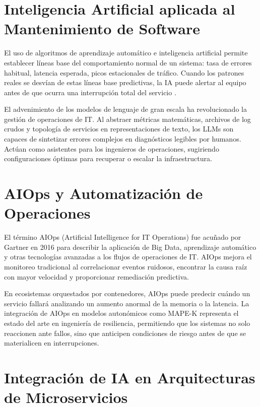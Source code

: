 \section{Inteligencia Artificial aplicada al Mantenimiento de Software}

El uso de algoritmos de aprendizaje autom\'{a}tico e inteligencia artificial permite establecer l\'{i}neas base del comportamiento normal de un sistema: tasa de errores habitual, latencia esperada, picos estacionales de tr\'{a}fico. Cuando los patrones reales se desv\'{i}an de estas l\'{i}neas base predictivas, la IA puede alertar al equipo antes de que ocurra una interrupci\'{o}n total del servicio \cite{notaro2021aiops}.

El advenimiento de los modelos de lenguaje de gran escala ha revolucionado la gesti\'{o}n de operaciones de IT. Al abstraer m\'{e}tricas matem\'{a}ticas, archivos de log crudos y topolog\'{i}a de servicios en representaciones de texto, los LLMs son capaces de sintetizar errores complejos en diagn\'{o}sticos legibles por humanos. Act\'{u}an como asistentes para los ingenieros de operaciones, sugiriendo configuraciones \'{o}ptimas para recuperar o escalar la infraestructura.

\section{AIOps y Automatizaci\'{o}n de Operaciones}

El t\'{e}rmino AIOps (Artificial Intelligence for IT Operations) fue acu\~{n}ado por Gartner en 2016 \cite{gartner2016aiops} para describir la aplicaci\'{o}n de Big Data, aprendizaje autom\'{a}tico y otras tecnolog\'{i}as avanzadas a los flujos de operaciones de IT. AIOps mejora el monitoreo tradicional al correlacionar eventos ruidosos, encontrar la causa ra\'{i}z con mayor velocidad y proporcionar remediaci\'{o}n predictiva.

En ecosistemas orquestados por contenedores, AIOps puede predecir cu\'{a}ndo un servicio fallar\'{a} analizando un aumento anormal de la memoria o la latencia. La integraci\'{o}n de AIOps en modelos auton\'{o}micos como MAPE-K representa el estado del arte en ingenier\'{i}a de resiliencia, permitiendo que los sistemas no solo reaccionen ante fallos, sino que anticipen condiciones de riesgo antes de que se materialicen en interrupciones.

\section{Integraci\'{o}n de IA en Arquitecturas de Microservicios}

